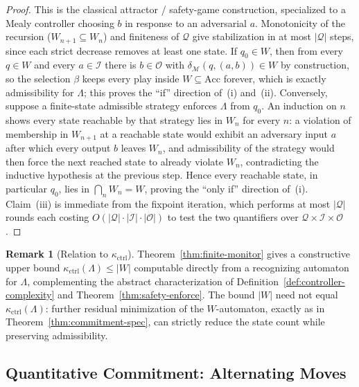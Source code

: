 \documentclass[12pt]{article}
\theoremstyle{definition}
\newtheorem{remark}[theorem]{Remark}
\begin{document}
\begin{proof}
This is the classical attractor / safety-game construction, specialized to a
Mealy controller choosing $b$ in response to an adversarial $a$.
Monotonicity of the recursion ($W_{n+1}\subseteq W_n$) and finiteness of
$\mathcal Q$ give stabilization in at most $|\mathcal Q|$ steps, since each
strict decrease removes at least one state.  If $q_0\in W$, then from every
$q\in W$ and every $a\in\mathcal I$ there is $b\in\mathcal O$ with
$\delta_{\mathcal M}(q,(a,b))\in W$ by construction, so the selection $\beta$
keeps every play inside $W\subseteq\mathrm{Acc}$ forever, which is exactly
admissibility for $\Lambda$; this proves the ``if'' direction of~(i)
and~(ii).  Conversely, suppose a finite-state admissible strategy enforces
$\Lambda$ from $q_0$.  An induction on $n$ shows every state reachable by
that strategy lies in $W_n$ for every $n$: a violation of membership in
$W_{n+1}$ at a reachable state would exhibit an adversary input $a$ after
which every output $b$ leaves $W_n$, and admissibility of the strategy would
then force the next reached state to already violate $W_n$, contradicting
the inductive hypothesis at the previous step.  Hence every reachable state,
in particular $q_0$, lies in $\bigcap_nW_n=W$, proving the ``only if''
direction of~(i).  Claim~(iii) is immediate from the fixpoint iteration,
which performs at most $|\mathcal Q|$ rounds each costing
$O(|\mathcal Q|\cdot|\mathcal I|\cdot|\mathcal O|)$ to test the two
quantifiers over $\mathcal Q\times\mathcal I\times\mathcal O$.
\end{proof}

\begin{remark}[Relation to $\kappa_{\mathrm{ctrl}}$]
\label{rem:finite-monitor-scope}
Theorem~\ref{thm:finite-monitor} gives a constructive upper bound
$\kappa_{\mathrm{ctrl}}(\Lambda)\le|W|$ computable directly from a
recognizing automaton for $\Lambda$, complementing the abstract
characterization of Definition~\ref{def:controller-complexity} and
Theorem~\ref{thm:safety-enforce}.  The bound $|W|$ need not equal
$\kappa_{\mathrm{ctrl}}(\Lambda)$: further residual minimization of the
$W$-automaton, exactly as in Theorem~\ref{thm:commitment-spec}, can strictly
reduce the state count while preserving admissibility.
\end{remark}

\subsection{Quantitative Commitment: Alternating Moves}
\label{subsec:quant-alt}
\end{document}
